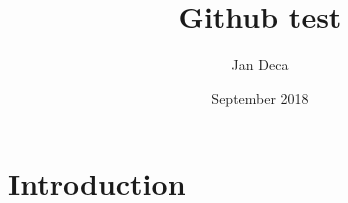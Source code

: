 \documentclass{article}
\title{Github test}
\author{Jan Deca}
\date{September 2018}
\begin{document}
\maketitle

\section{Introduction}
\end{document}
